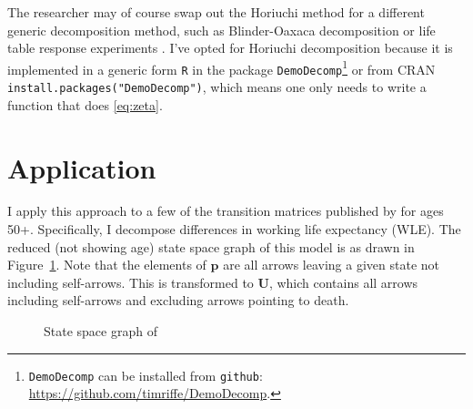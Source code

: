 \documentclass{article}
\begin{document}
The researcher may of course swap out the Horiuchi method for a different generic decomposition method, such as Blinder-Oaxaca decomposition \citep{blinder1973wage, oaxaca1973male} or life table response experiments \citep{caswell1989analysis}. I've opted for Horiuchi decomposition because it is implemented in a generic form \texttt{R} in the package \texttt{DemoDecomp}\footnote{\texttt{DemoDecomp} can be installed from \texttt{github}: \url{https://github.com/timriffe/DemoDecomp}.} or from CRAN \texttt{install.packages("DemoDecomp")}, which means one only needs to write a function that does \eqref{eq:zeta}.

\section{Application}
I apply this approach to a few of the transition matrices published by \citet{Dudel2017} for ages 50+. Specifically, I decompose differences in working life expectancy (WLE). The reduced (not showing age) state space graph of this model is as drawn in Figure~\ref{fig:dudelstates}. Note that the elements of $\textbf{p}$ are all arrows leaving a given state not including self-arrows. This is transformed to $\textbf{U}$, which contains all arrows including self-arrows and excluding arrows pointing to death. 

\begin{figure}[ht!]
\begin{center}
\caption{State space graph of \citet{Dudel2017}}
\label{fig:dudelstates}
\end{center}
\end{figure}
\end{document}
